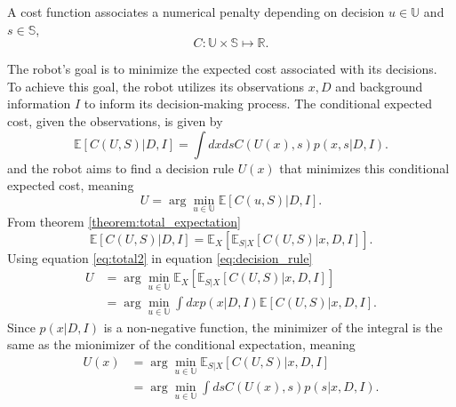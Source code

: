 \begin{definition}
	\label{def:cost_function}
	A cost function associates a numerical penalty depending on decision $u \in \mathbb{U}$ and $s \in \mathbb{S}$,
	\begin{equation}
		C: \mathbb{U} \times \mathbb{S} \mapsto \mathbb{R}.
	\end{equation}
\end{definition}

The robot's goal is to minimize the expected cost associated with its decisions. To achieve this goal, the robot utilizes its observations $x,D$ and background information $I$ to inform its decision-making process. The conditional expected cost, given the observations, is given by
\begin{equation}
	\mathbb{E}[C(U, S)|D,I] = \int dx ds C(U(x),s) p(x,s|D,I).
\end{equation}
and the robot aims to find a decision rule $U(x)$ that minimizes this conditional expected cost, meaning
\begin{equation}
	U = \arg\min_{u \in \mathbb{U}} \mathbb{E}[C(u, S)|D,I].
	\label{eq:decision_rule}
\end{equation}	
From theorem \ref{theorem:total_expectation}
\begin{equation}
	\mathbb{E}[C(U, S)|D,I] = \mathbb{E}_X[\mathbb{E}_{S|X}[C(U, S)|x,D,I]].
	\label{eq:total2}
\end{equation}
Using equation \eqref{eq:total2} in equation \eqref{eq:decision_rule}
\begin{equation}
	\begin{split}
		U &= \arg\min_{u \in \mathbb{U}} \mathbb{E}_X[\mathbb{E}_{S|X}[C(U, S)|x,D,I]]\\
		&= \arg\min_{u \in \mathbb{U}} \int dxp(x|D,I) \mathbb{E}[C(U, S)|x,D,I].
	\end{split}
	\label{eq:decision_rule2}
\end{equation}
Since $p(x|D,I)$ is a non-negative function, the minimizer of the integral is the same as the mionimizer of the conditional expectation, meaning
\begin{equation}
	\begin{split}
		U(x) &= \arg\min_{u \in \mathbb{U}} \mathbb{E}_{S|X}[C(U, S)|x,D,I]\\
		& = \arg\min_{u \in \mathbb{U}}\int  ds C(U(x),s) p(s|x,D,I).
	\end{split}
	\label{eq:decision_rule3}
\end{equation}

